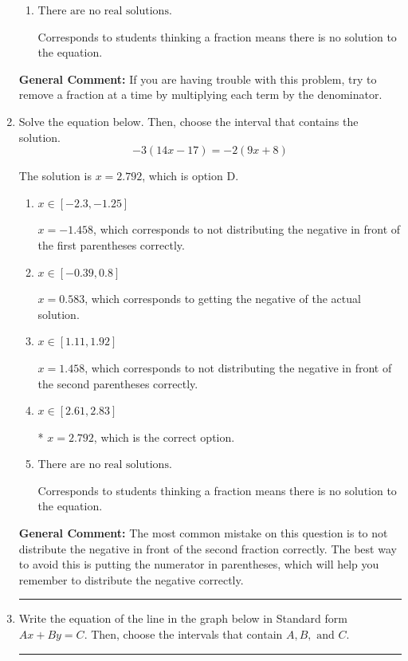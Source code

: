 \documentclass{extbook}[14pt]
\newcommand{\litem}[1]{\item #1

\rule{\textwidth}{0.4pt}}
\begin{document}
\begin{enumerate}
{\begin{enumerate}[label=\Alph*.]
 $x = 0.485$, which corresponds to dividing the second number in the numerator by the denominator rather than dividing BOTH parts of the numerator by the denominator (or removing the fractions through multiplication).
\item \( \text{There are no real solutions.} \)

Corresponds to students thinking a fraction means there is no solution to the equation.
\end{enumerate}

\textbf{General Comment:} If you are having trouble with this problem, try to remove a fraction at a time by multiplying each term by the denominator.
}
\litem{
Solve the equation below. Then, choose the interval that contains the solution.
\[ -3(14x -17) = -2(9x + 8) \]

The solution is \( x = 2.792 \), which is option D.\begin{enumerate}[label=\Alph*.]
\item \( x \in [-2.3, -1.25] \)

$x = -1.458$, which corresponds to not distributing the negative in front of the first parentheses correctly.
\item \( x \in [-0.39, 0.8] \)

$x = 0.583$, which corresponds to getting the negative of the actual solution.
\item \( x \in [1.11, 1.92] \)

$x = 1.458$, which corresponds to not distributing the negative in front of the second parentheses correctly.
\item \( x \in [2.61, 2.83] \)

* $x = 2.792$, which is the correct option.
\item \( \text{There are no real solutions.} \)

Corresponds to students thinking a fraction means there is no solution to the equation.
\end{enumerate}

\textbf{General Comment:} The most common mistake on this question is to not distribute the negative in front of the second fraction correctly. The best way to avoid this is putting the numerator in parentheses, which will help you remember to distribute the negative correctly.
}
\litem{
Write the equation of the line in the graph below in Standard form $Ax+By=C$. Then, choose the intervals that contain $A, B, \text{ and } C$.

}
\end{enumerate}
\end{document}
